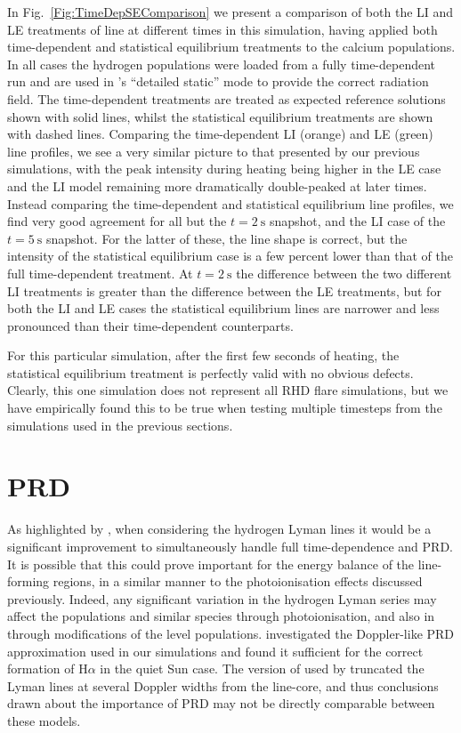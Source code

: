 In Fig.~\ref{Fig:TimeDepSEComparison} we present a comparison of both the LI and LE treatments of \CaLine{} line at different times in this simulation, having applied both time-dependent and statistical equilibrium treatments to the calcium populations.
In all cases the hydrogen populations were loaded from a fully time-dependent run and are used in \Lw{}'s ``detailed static'' mode to provide the correct radiation field.
The time-dependent treatments are treated as expected reference solutions shown with solid lines, whilst the statistical equilibrium treatments are shown with dashed lines.
Comparing the time-dependent LI (orange) and LE (green) line profiles, we see a very similar picture to that presented by our previous simulations, with the peak intensity during heating being higher in the LE case and the LI model remaining more dramatically double-peaked at later times.
Instead comparing the time-dependent and statistical equilibrium line profiles, we find very good agreement for all but the $t=\SI{2}{\second}$ snapshot, and the LI case of the $t=\SI{5}{\second}$ snapshot.
For the latter of these, the line shape is correct, but the intensity of the statistical equilibrium case is a few percent lower than that of the full time-dependent treatment.
At $t=\SI{2}{\second}$ the difference between the two different LI treatments is greater than the difference between the LE treatments, but for both the LI and LE cases the statistical equilibrium lines are narrower and less pronounced than their time-dependent counterparts.

For this particular simulation, after the first few seconds of heating, the statistical equilibrium treatment is perfectly valid with no obvious defects.
Clearly, this one simulation does not represent all RHD flare simulations, but we have empirically found this to be true when testing multiple timesteps from the simulations used in the previous sections.


\section{PRD}\label{Sec:TimeDepPrd}

As highlighted by \citet{Brown2018}, when considering the hydrogen Lyman lines it would be a significant improvement to simultaneously handle full time-dependence and PRD.
It is possible that this could prove important for the energy balance of the line-forming regions, in a similar manner to the photoionisation effects discussed previously.
Indeed, any significant variation in the hydrogen Lyman series may affect the populations \Caii{} and similar species through photoionisation, and also in \Ha{} through modifications of the level populations.
\citet{Leenaarts2012a} investigated the Doppler-like PRD approximation used in our \Radyn{} simulations and found it sufficient for the correct formation of H$\alpha$ in the quiet Sun case.
The version of \Radyn{} used by \citet{Brown2018} truncated the Lyman lines at several Doppler widths from the line-core, and thus conclusions drawn about the importance of PRD may not be directly comparable between these models.


